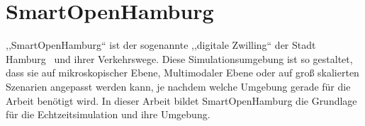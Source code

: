 %
%
\section{SmartOpenHamburg}\label{sec:smart-open-hamburg}

,,SmartOpenHamburg`` ist der sogenannte ,,digitale Zwilling`` der Stadt Hamburg~\cite{SOH2023} und ihrer Verkehrswege.
Diese Simulationsumgebung ist so gestaltet, dass sie auf mikroskopischer Ebene, Multimodaler Ebene oder auf groß skalierten Szenarien angepasst werden kann, je nachdem welche Umgebung gerade für die Arbeit benötigt wird.
In dieser Arbeit bildet SmartOpenHamburg die Grundlage für die Echtzeitsimulation und ihre Umgebung.
